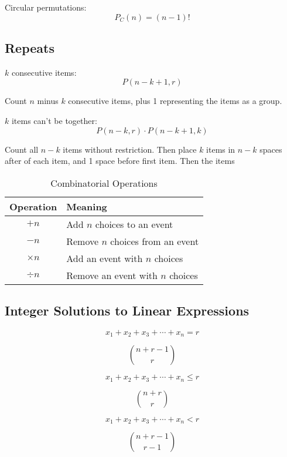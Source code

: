 \documentclass{article}
\begin{document}
    Circular permutations: \begin{equation}
        P_C(n) = (n - 1)!
    \end{equation}

    \subsection{Repeats}

    $k$ consecutive items: \begin{equation}
        P(n - k + 1, r)
    \end{equation}

    Count $n$ minus $k$ consecutive items, plus 1 representing the items as a group.

    $k$ items can't be together: \begin{equation}
        P(n - k, r) \cdot P(n - k + 1, k)
    \end{equation}

    Count all $n - k$ items without restriction. Then place $k$ items in $n - k$ spaces after of each item, and 1 space before first item. Then the items

    \begin{table}[h]
        \caption{Combinatorial Operations}
        \centering
        \begin{tabular}{cl}
            \toprule
            Operation & Meaning \\
            \midrule
            $+ n$ & Add $n$ choices to an event \\
            $- n$ & Remove $n$ choices from an event \\
            $\times n$ & Add an event with $n$ choices \\
            $\div n$ & Remove an event with $n$ choices \\
            \bottomrule
        \end{tabular}
    \end{table}

    \subsection{Integer Solutions to Linear Expressions}

    $$x_1 + x_2 + x_3 + \cdots + x_n = r$$
    
    $${n + r - 1 \choose r}$$

    $$x_1 + x_2 + x_3 + \cdots + x_n \leq r$$
    
    $${n + r \choose r}$$

    $$x_1 + x_2 + x_3 + \cdots + x_n < r$$
    
    $${n + r - 1 \choose r - 1}$$
\end{document}
